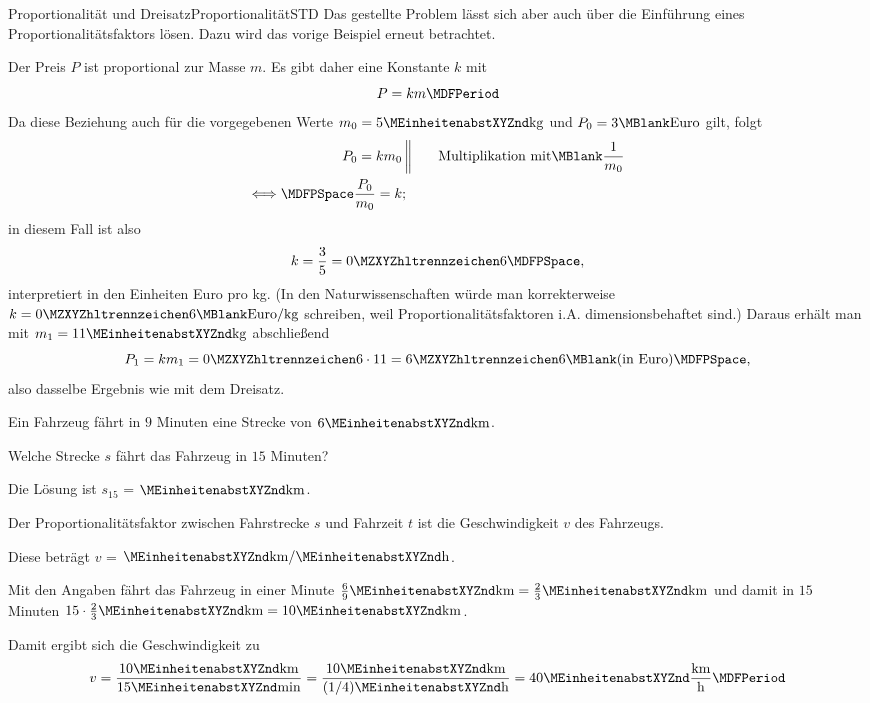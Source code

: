 \begin{MXContent}{Proportionalität und Dreisatz}{Proportionalität}{STD}
Das gestellte Problem lässt sich aber auch über die Einführung eines
Proportionalitätsfaktors lösen. Dazu wird das vorige Beispiel erneut
betrachtet.
\begin{MExample}
Der Preis $P$ ist proportional zur Masse $m$. Es gibt daher eine Konstante
$k$ mit
$$
P=k m \MDFPeriod
$$
Da diese Beziehung auch für die vorgegebenen Werte $m_0=5\MEinheit{kg}$
und $P_0=3\MBlank\text{Euro}$ gilt, folgt
\begin{eqnarray*}
  P_0=k m_0 & \MTSP\MSep\MTSP & \text{Multiplikation mit}\MBlank \frac{1}{m_0} \\
  \Longleftrightarrow\MDFPSpace\frac{P_0}{m_0}=k &;& 
\end{eqnarray*}
in diesem Fall ist also
$$
k=\frac{3}{5} = \MZahl{0}{6} \MDFPSpace,
$$
interpretiert in den Einheiten Euro pro kg. (In den Naturwissenschaften
würde man korrekterweise $k=\MZahl{0}{6} \MBlank \text{Euro}/\MEinheit[]{kg}$
schreiben, weil Proportionalitätsfaktoren i.A. dimensionsbehaftet sind.)
Daraus erhält man mit $m_1=11\MEinheit{kg}$ abschließend
$$
P_1=k m_1 = \MZahl{0}{6}\cdot 11 =\MZahl{6}{6} \MBlank \text{(in Euro)}
\MDFPSpace,
$$
also dasselbe Ergebnis wie mit dem Dreisatz.
\end{MExample}

\begin{MExercise}
Ein Fahrzeug fährt in $9$ Minuten eine Strecke von $6\MEinheit{km}$.
\begin{MExerciseItems}
\item{%
Welche Strecke $s$ fährt das Fahrzeug in $15$ Minuten?
\medskip\par
Die Lösung ist $s_{15}$ = $\MEinheit{km}$.
}
\item{%
Der Proportionalitätsfaktor zwischen Fahrstrecke $s$ und Fahrzeit $t$
ist die Geschwindigkeit $v$ des Fahrzeugs.
\medskip\par
Diese beträgt $v$ = $\MEinheit{km}/\MEinheit{h}$.
}
\end{MExerciseItems}
\begin{MHint}{\iSolution}
Mit den Angaben fährt das Fahrzeug in einer Minute $\frac{6}{9}\MEinheit{km}
=\frac{2}{3}\MEinheit{km}$ und damit in $15$ Minuten 
$15\cdot\frac{2}{3}\MEinheit{km}=10\MEinheit{km}$.
\par
Damit ergibt sich die Geschwindigkeit zu 
$$v=\frac{10\MEinheit{km}}{15\MEinheit{min}} = 
\frac{10\MEinheit{km}}{(1/4)\MEinheit{h}} =
40\MEinheit{}\frac{\MEinheit[]{km}}{\MEinheit[]{h}}
\MDFPeriod
$$
\end{MHint}
\end{MExercise}
\end{MXContent}

